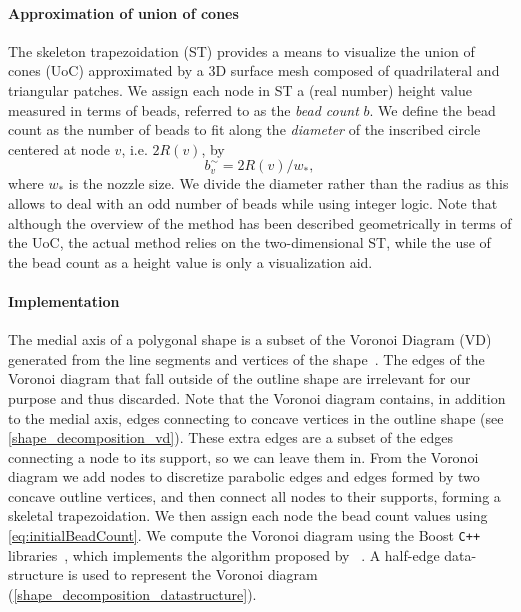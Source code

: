 \paragraph{Approximation of union of cones}
The skeleton trapezoidation (ST) provides a means to visualize the union of cones (UoC) approximated by a 3D surface mesh composed of quadrilateral and triangular patches.
We assign each node in ST a (real number) height value measured in terms of beads, referred to as the \emph{bead count} $b$.
We define the bead count as the number of beads to fit along the \emph{diameter} of the inscribed circle centered at node $v$, i.e. $2R(v)$, by
\begin{equation}
    b^\sim_v = 2 R(v) / w_*,
\label{eq:initialBeadCount}
\end{equation}
where $w_*$ is the nozzle size. 
We divide the diameter rather than the radius as this allows to deal with an odd number of beads while using integer logic.
Note that although the overview of the method has been described geometrically in terms of the UoC, the actual method relies on the two-dimensional ST, while the use of the bead count as a height value is only a visualization aid.







\paragraph{Implementation}
The medial axis of a polygonal shape is a subset of the Voronoi Diagram (VD) generated from the line segments and vertices of the shape~\cite{lee1982medial}. 
The edges of the Voronoi diagram that fall outside of the outline shape are irrelevant for our purpose and thus discarded.
Note that the Voronoi diagram contains, in addition to the medial axis, edges connecting to concave vertices in the outline shape (see \cref{shape_decomposition_vd}). 
These extra edges are a subset of the edges connecting a node to its support, so we can leave them in.
From the Voronoi diagram we add nodes to discretize parabolic edges and edges formed by two concave outline vertices, and then connect all nodes to their supports, forming a skeletal trapezoidation. 
We then assign each node the bead count values using \cref{eq:initialBeadCount}.
We compute the Voronoi diagram using the Boost \verb!C++! libraries~\cite{schaling2011boost}, which implements the algorithm proposed by \citeauthor{fortune1986sascg}~\cite{fortune1986sascg}.
A half-edge data-structure is used to represent the Voronoi diagram (\cref{shape_decomposition_datastructure}).

